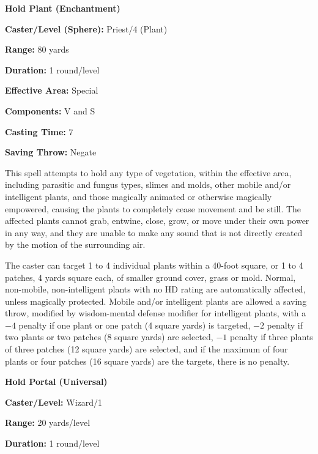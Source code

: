 \begin{multicols}{2}
\begin{minipage}{\columnwidth}
\noindent \textbf{Hold Plant (Enchantment)}

\noindent \textbf{Caster/Level (Sphere):} Priest/4 (Plant)

\noindent \textbf{Range:} 80 yards

\noindent \textbf{Duration:} 1 round/level

\noindent \textbf{Effective Area:} Special

\noindent \textbf{Components:} V and S

\noindent \textbf{Casting Time:} 7

\noindent \textbf{Saving Throw:} Negate

\end{minipage}

This spell attempts to hold any type of vegetation, within the effective area, including parasitic and fungus types, slimes and molds, other mobile and/or intelligent plants, and those magically animated or otherwise magically empowered, causing the plants to completely cease movement and be still.  The affected plants cannot grab, entwine, close, grow, or move under their own power in any way, and they are unable to make any sound that is not directly created by the motion of the surrounding air.

The caster can target 1 to 4 individual plants within a 40-foot square, or 1 to 4 patches, 4 yards square each, of smaller ground cover, grass or mold.  Normal, non-mobile, non-intelligent plants with no HD rating are automatically affected, unless magically protected.  Mobile and/or intelligent plants are allowed a saving throw, modified by wisdom-mental defense modifier for intelligent plants, with a $-4$ penalty if one plant or one patch (4 square yards) is targeted, $-2$ penalty if two plants or two patches (8 square yards) are selected, $-1$ penalty if three plants of three patches (12 square yards) are selected, and if the maximum of four plants or four patches (16 square yards) are the targets, there is no penalty.

\vspace{1em}

\noindent
\begin{minipage}{\columnwidth}

\noindent \textbf{Hold Portal (Universal)}

\noindent \textbf{Caster/Level:} Wizard/1

\noindent \textbf{Range:} 20 yards/level

\noindent \textbf{Duration:} 1 round/level


\end{minipage}
\end{multicols}
